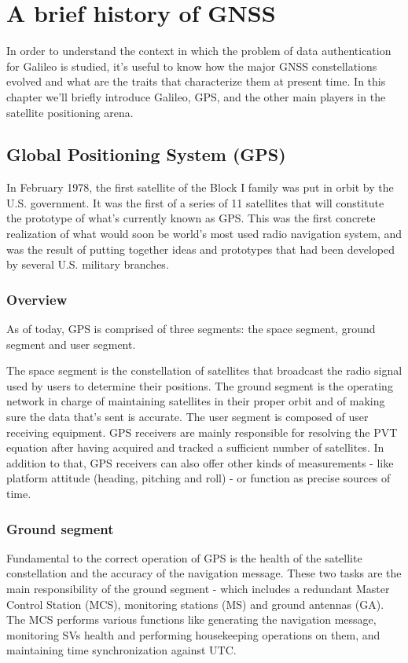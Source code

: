 
\chapter{A brief history of GNSS}

In order to understand the context in which the problem of data authentication
for Galileo is studied, it's useful to know how the major GNSS constellations
evolved and what are the traits that characterize them at present time. In
this chapter we'll briefly introduce Galileo, GPS, and the other main players
in the satellite positioning arena.

\section{Global Positioning System (GPS)}
In February 1978, the first satellite of the Block I family was put in orbit by
the U.S. government. It was the first of a series of 11 satellites that will
constitute the prototype of what's currently known as GPS. This was the first
concrete realization of what would soon be world's most used radio navigation
system, and was the result of putting together ideas and prototypes that had
been developed by several U.S. military branches.

\subsection{Overview}
As of today, GPS is comprised of three segments: the space segment, ground
segment and user segment.

The space segment is the constellation of satellites that broadcast the radio
signal used by users to determine their positions. The ground segment is the
operating network in charge of maintaining satellites in their proper orbit and
of making sure the data that's sent is accurate. The user segment is composed of
user receiving equipment. GPS receivers are mainly responsible for resolving the
PVT equation after having acquired and tracked a sufficient number of
satellites. In addition to that, GPS receivers can also offer other kinds of
measurements - like platform attitude (heading, pitching and roll) - or function
as precise sources of time.

\subsection{Ground segment}
Fundamental to the correct operation of GPS is the health of the satellite
constellation and the accuracy of the navigation message. These two tasks are
the main responsibility of the ground segment - which includes a redundant
Master Control Station (MCS), monitoring stations (MS) and ground antennas (GA).
The MCS performs various functions like generating the navigation message,
monitoring SVs health and performing housekeeping operations on them, and
maintaining time synchronization against UTC.

